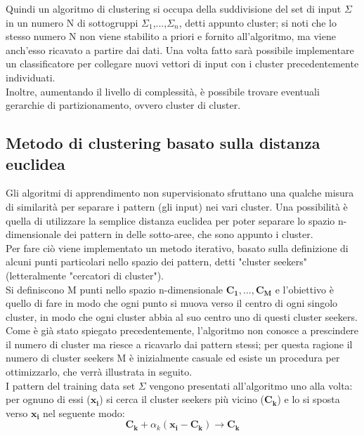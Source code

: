 Quindi un algoritmo di clustering si occupa della suddivisione del set di input $\Sigma$ in un numero N di sottogruppi $\Sigma_1$,...,$\Sigma_n$, detti appunto cluster; si noti che lo stesso numero N non viene stabilito a priori e fornito all'algoritmo, ma viene anch'esso ricavato a partire dai dati. Una volta fatto sarà possibile implementare un classificatore per collegare nuovi vettori di input con i cluster precedentemente individuati.\\
Inoltre, aumentando il livello di complessità, è possibile trovare eventuali gerarchie di partizionamento, ovvero cluster di cluster.

\newpage

\subsection{Metodo di clustering basato sulla distanza euclidea}
\label{metodo distanza euclidea}
Gli algoritmi di apprendimento non supervisionato sfruttano una qualche misura di similarità per separare i pattern (gli input) nei vari cluster. Una possibilità è quella di utilizzare la semplice distanza euclidea per poter separare lo spazio n-dimensionale dei pattern in delle sotto-aree, che sono appunto i cluster. \\
Per fare ciò viene implementato un metodo iterativo, basato sulla definizione di alcuni punti particolari nello spazio dei pattern, detti "cluster seekers" (letteralmente "cercatori di cluster"). \\
Si definiscono M punti nello spazio n-dimensionale $\textbf{C}_\textbf{1},...,\textbf{C}_\textbf{M}$ e l'obiettivo è quello di fare in modo che ogni punto si muova verso il centro di ogni singolo cluster, in modo che ogni cluster abbia al suo centro uno di questi cluster seekers. \\
Come è già stato spiegato precedentemente, l'algoritmo non conosce a prescindere il numero di cluster ma riesce a ricavarlo dai pattern stessi; per questa ragione il numero di cluster seekers M è inizialmente casuale ed esiste un procedura per ottimizzarlo, che verrà illustrata in seguito. \\
I pattern del training data set $\Sigma$ vengono presentati all'algoritmo uno alla volta: per ognuno di essi ($\textbf{x}_\textbf{i}$) si cerca il cluster seekers più vicino ($\textbf{C}_\textbf{k}$) e lo si sposta verso $\textbf{x}_\textbf{i}$ nel seguente modo:
\begin{equation}
\textbf{C}_\textbf{k} + \alpha_k(\textbf{x}_\textbf{i} - \textbf{C}_\textbf{k}) \rightarrow \textbf{C}_\textbf{k}
\end{equation}
